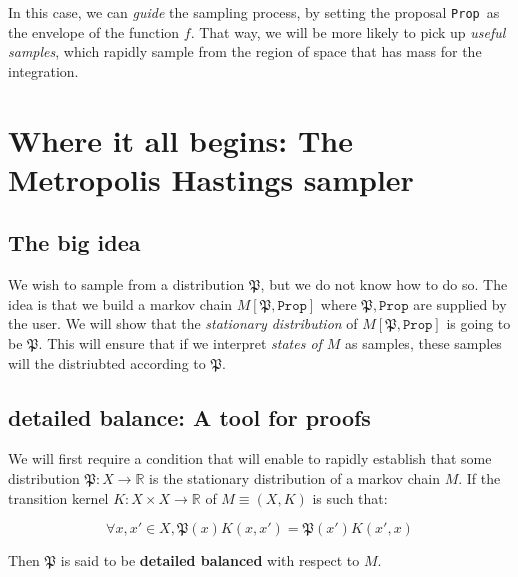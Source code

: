 \documentclass[titlepage]{article}
\newcommand{\R}{\mathbb{R}}
\renewcommand{\P}{\mathfrak{P}}
\newcommand{\Prop}{\texttt{Prop}}
\begin{document}
In this case, we can \emph{guide} the sampling process, by setting the proposal
\Prop~as the envelope of the function $f$. That way, we will be more likely
to pick up \emph{useful samples}, which rapidly sample from the region of
space that has mass for the integration.



\section{Where it all begins: The Metropolis Hastings sampler}
\subsection{The big idea}
We wish to sample from a distribution $\P$, but we do not know how to do so.
The idea is that we build a markov chain $M[\P, \Prop]$ where $\P, \Prop$ are
supplied by the user. We will show that the \emph{stationary distribution} of $M[\P, \Prop]$
is going to be $\P$. This will ensure that if we interpret \emph{states of $M$} as samples,
these samples will the distriubted according to $\P$.

\subsection{detailed balance: A tool for proofs}
We will first require a condition that will enable to rapidly establish that some
distribution $\P: X \rightarrow \R$ is the stationary distribution of a markov chain $M$. If
the transition kernel $K: X \times X \rightarrow \R$ of $M \equiv (X, K)$ is such that:

$$
\forall x, x' \in X, \P(x) K(x, x') = \P(x') K(x', x)
$$

Then $\P$ is said to be \textbf{detailed balanced} with respect to $M$.
\end{document}
